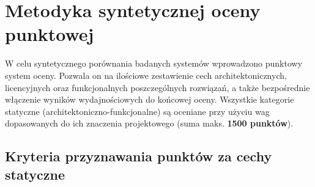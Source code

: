 \section{Metodyka syntetycznej oceny punktowej}

W celu syntetycznego porównania badanych systemów wprowadzono punktowy system oceny. Pozwala on na ilościowe zestawienie cech architektonicznych, licencyjnych oraz funkcjonalnych poszczególnych rozwiązań, a także bezpośrednie włączenie wyników wydajnościowych do końcowej oceny. Wszystkie kategorie statyczne (architektoniczno-funkcjonalne) są oceniane przy użyciu wag dopasowanych do ich znaczenia projektowego (suma maks. \textbf{1500 punktów}).

\subsection{Kryteria przyznawania punktów za cechy statyczne}

